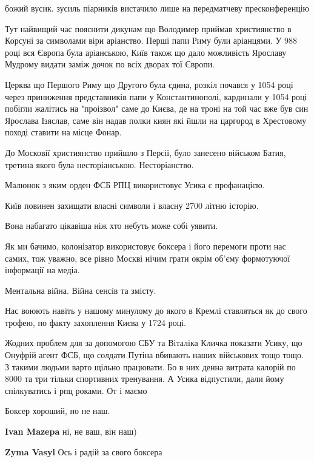 \begin{itemize}
божий вусик. зусиль піарників вистачило лише на передматчеву пресконференцію


Тут найвищий час пояснити дикунам що Володимер приймав християнство в Корсуні
за символами віри аріанство. Перші папи Риму були аріанцями. У 988 році вся
Європа була аріанською, Київ також що дало можливість Ярославу Мудрому видати
заміж дочок по всіх дворах тої Європи.

Церква що Першого Риму що Другого була єдина, розкіл почався у 1054 році через
приниження представників папи у Константинополі, кардинали у 1054 році побігли
жалітись на "проізвол" саме до Києва, де на троні на той час вже був син
Ярослава Ізяслав, саме він надав полки киян які йшли на царгород в Хрестовому
поході ставити на місце Фонар.

До Московії християнство прийшло з Персії, було занесено військом Батия,
третина якого була несторіанською. Несторіанство.

Малюнок з яким орден ФСБ РПЦ використовує Усика є профанацією.

Київ повинен захищати власні символи і власну 2700 літню історію.

Вона набагато цікавіша ніж хто небуть може собі уявити.

Як ми бачимо, колонізатор використовує боксера і його перемоги проти нас самих,
тож уважно, все рівно Москві нічим грати окрім об'єму формотуючої інформації на
медіа.

Ментальна війна. Війна сенсів та змісту.

Нас воюють навіть у нашому минулому до якого в Кремлі ставляться як до свого
трофею, по факту захоплення Києва у 1724 році.


Жодних проблем для за допомогою СБУ та Віталіка Кличка показати Усику, що
Онуфрій агент ФСБ, що солдати Путіна вбивають наших військових тощо тощо. З
такими людьми варто щільно працювати. Бо в них денна витрата калорій по 8000 та
три тільки спортивних тренування. А Усика відпустили, дали йому спілкуватись і
рпц роками. От і маємо

Боксер хороший, но не наш.

\begin{itemize} %
\textbf{Ivan Mazepa} ні, не ваш, він наш)

\textbf{Zyma Vasyl} Ось і радій за свого боксера


\end{itemize}
\end{itemize}
